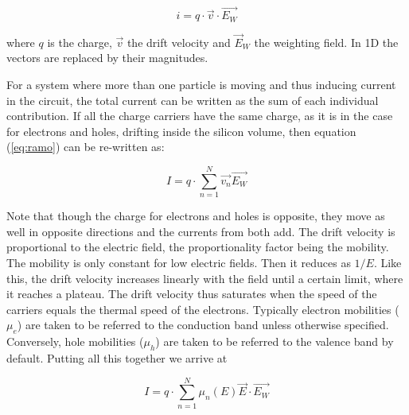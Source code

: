 \begin{equation}
	i = q \cdot \overrightarrow {v} \cdot \overrightarrow {E_{W}}
	\label{eq:ramo} 
\end{equation} 

where $q$ is the charge, $\overrightarrow {v}$ the drift velocity and $\overrightarrow E_{W}$ the weighting
field. In 1D the vectors are replaced by their magnitudes.

For a system where more than one particle is moving and thus inducing current in
the circuit, the total current can be written as the sum of each individual
contribution. If all the charge carriers have the same charge, as it is in the
case for electrons and holes, drifting inside the silicon volume, then equation
(\ref{eq:ramo}) can be re-written as:

\begin{equation}
	I = q \cdot \sum_{n=1}^{N} \overrightarrow {v_n}\overrightarrow {E_{W}} 	\label{eq:ramoTot} 
\end{equation} 

Note that though the charge for electrons and holes is opposite, they move as
well in opposite directions and the currents from both add. The drift velocity 
is proportional to the electric field, the proportionality factor being 
the mobility. The mobility is only constant for low electric fields. Then 
it reduces as $1/E$. Like this, the drift velocity increases linearly with 
the field until a certain limit, where it reaches a plateau. The drift 
velocity thus saturates when the speed of the carriers equals the thermal 
speed of the electrons. Typically electron mobilities ($ \mu_e $) are taken to 
be referred to the conduction band unless otherwise specified. Conversely, 
hole mobilities ($ \mu_h $) are taken to be referred to the valence band 
by default. Putting all this together we arrive at 

\begin{equation}
	I = q \cdot \sum_{n=1}^{N} \mu_n(E) \overrightarrow {E} \cdot \overrightarrow {E_{W}} 
\label{eq:ramoMob}
\end{equation}

